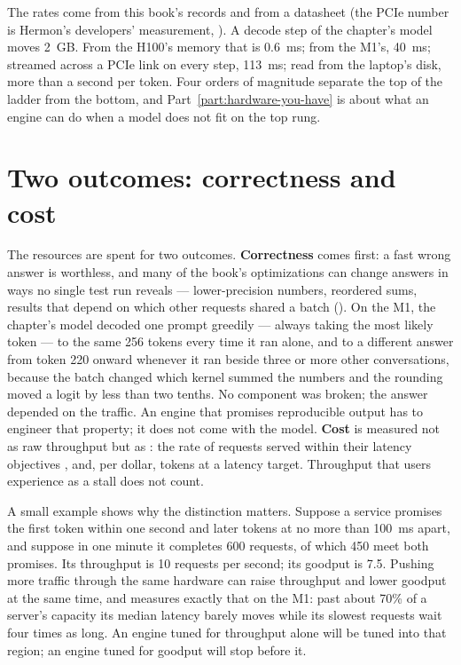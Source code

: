 \noindent The rates come from this book's records and from a datasheet (the
PCIe number is Hermon's developers' measurement, ). A decode
step of the chapter's model moves 2~GB. From the H100's memory that is 0.6~ms;
from the M1's, 40~ms; streamed across a PCIe link on every step, 113~ms; read from
the laptop's disk, more than a second per token. Four orders of magnitude separate
the top of the ladder from the bottom, and Part~\ref{part:hardware-you-have} is
about what an engine can do when a model does not fit on the top rung.

\section{Two outcomes: correctness and cost}

The resources are spent for two outcomes. \textbf{Correctness} comes first: a
fast wrong answer is worthless, and many of the book's optimizations can
change answers in ways no single test run reveals --- lower-precision numbers,
reordered sums, results that depend on which other requests shared a batch
(). On the M1, the chapter's model decoded one prompt
greedily --- always taking the most likely token --- to the same 256 tokens every
time it ran alone, and to a different answer from token 220 onward whenever it
ran beside three or more other conversations, because the batch changed which
kernel summed the numbers and the rounding moved a logit by less than two tenths.
No component was broken; the answer depended on the traffic. An engine that
promises reproducible output has to engineer that property; it does not come
with the model. \textbf{Cost} is measured not as raw throughput
but as : the rate of requests served within their latency
objectives \cite{zhong2024distserve}, and, per dollar, tokens at a latency
target. Throughput that users experience as a stall does not count.

A small example shows why the distinction matters. Suppose a service promises
the first token within one second and later tokens at no more than 100~ms
apart, and suppose in one minute it completes 600 requests, of which 450 meet
both promises. Its throughput is 10 requests per second; its goodput is 7.5.
Pushing more traffic through the same hardware can raise throughput and lower
goodput at the same time, and  measures exactly that on the
M1: past about 70\% of a server's capacity its median latency barely moves
while its slowest requests wait four times as long. An engine tuned for
throughput alone will be tuned into that region; an engine tuned for goodput
will stop before it.

